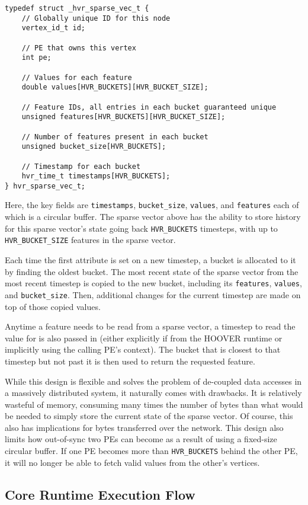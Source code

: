 \begin{verbatim}
typedef struct _hvr_sparse_vec_t {
    // Globally unique ID for this node
    vertex_id_t id;

    // PE that owns this vertex
    int pe;

    // Values for each feature
    double values[HVR_BUCKETS][HVR_BUCKET_SIZE];

    // Feature IDs, all entries in each bucket guaranteed unique
    unsigned features[HVR_BUCKETS][HVR_BUCKET_SIZE];

    // Number of features present in each bucket
    unsigned bucket_size[HVR_BUCKETS];

    // Timestamp for each bucket
    hvr_time_t timestamps[HVR_BUCKETS];
} hvr_sparse_vec_t;
\end{verbatim}

Here, the key fields are \texttt{timestamps}, \texttt{bucket\_size},
\texttt{values}, and \texttt{features} each of which is a circular buffer. The
sparse vector above has the ability to store history for this sparse vector's
state going back \texttt{HVR\_BUCKETS} timesteps, with up to
\texttt{HVR\_BUCKET\_SIZE} features in the sparse vector.

Each time the first attribute is set on a new timestep, a bucket is allocated to
it by finding the oldest bucket. The most recent state of the sparse vector from
the most recent timestep is copied to the new bucket, including its
\texttt{features}, \texttt{values}, and \texttt{bucket\_size}. Then, additional
changes for the current timestep are made on top of those copied values.

Anytime a feature needs to be read from a sparse vector, a timestep to read the
value for is also passed in (either explicitly if from the HOOVER runtime or
implicitly using the calling PE's context). The bucket that is closest to that
timestep but not past it is then used to return the requested feature.

While this design is flexible and solves the problem of de-coupled data accesses
in a massively distributed system, it naturally comes with drawbacks. It is
relatively wasteful of memory, consuming many times the number of bytes than
what would be needed to simply store the current state of the sparse vector. Of
course, this also has implications for bytes transferred over the network. This
design also limits how out-of-sync two PEs can become as a result of using a
fixed-size circular buffer. If one PE becomes more than \texttt{HVR\_BUCKETS}
behind the other PE, it will no longer be able to fetch valid values from the
other's vertices.

\subsection{Core Runtime Execution Flow}


